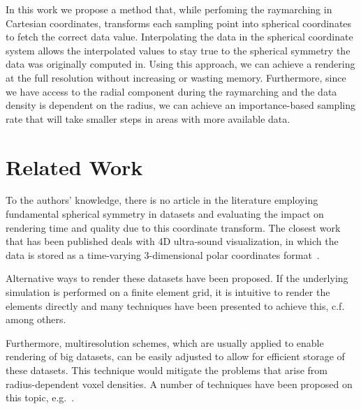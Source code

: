 \documentclass{egpubl}
\begin{document}
In this work we propose a method that, while perfoming the raymarching in Cartesian coordinates, transforms each sampling point into spherical coordinates to fetch the correct data value. Interpolating the data in the spherical coordinate system  allows the interpolated values to stay true to the spherical symmetry the data was originally computed in. Using this approach, we can achieve a rendering at the full resolution without increasing or wasting memory. Furthermore, since we have access to the radial component during the raymarching and the data density is dependent on the radius, we can achieve an importance-based sampling rate that will take smaller steps in areas with more available data.

\section{Related Work}
\label{sec:relatedwork}
To the authors' knowledge, there is no article in the literature employing fundamental spherical symmetry in datasets and evaluating the impact on rendering time and quality due to this coordinate transform. The closest work that has been published deals with 4D ultra-sound visualization, in which the data is stored as a time-varying 3-dimensional polar coordinates format~\cite{bruder11}.

Alternative ways to render these datasets have been proposed. If the underlying simulation is performed on a finite element grid, it is intuitive to render the elements directly and many techniques have been presented to achieve this, c.f.~\cite{ueff10,bock12} among others.

Furthermore, multiresolution schemes, which are usually applied to enable rendering of big datasets, can be easily adjusted to allow for efficient storage of these datasets. This technique would mitigate the problems that arise from radius-dependent voxel densities. A number of techniques have been proposed on this topic, e.g.~\cite{lamar99,weiler00,ljung06}.
\end{document}
